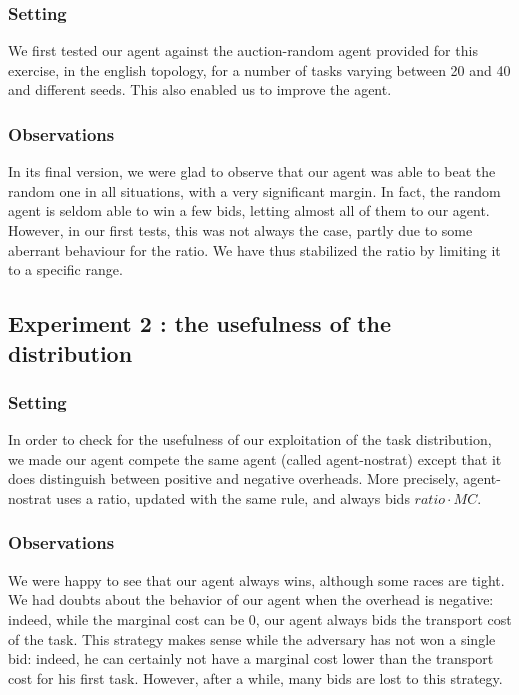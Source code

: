 \documentclass[11pt]{article}
\begin{document}
\subsubsection{Setting}
We first tested our agent against the auction-random agent provided for this exercise, in the english topology, for a number of tasks varying between 20 and 40 and different seeds. This also enabled us to improve the agent.

\subsubsection{Observations}
In its final version, we were glad to observe that our agent was able to beat the random one in all situations, with a very significant margin. In fact, the random agent is seldom able to win a few bids, letting almost all of them to our agent. However, in our first tests, this was not always the case, partly due to some aberrant behaviour for the ratio. We have thus stabilized the ratio by limiting it to a specific range. 

\subsection{Experiment 2 : the usefulness of the distribution}

\subsubsection{Setting}
In order to check for the usefulness of our exploitation of the task distribution, we made our agent compete the same agent (called agent-nostrat) except that it does distinguish between positive and negative overheads. More precisely, agent-nostrat uses a ratio, updated with the same rule, and always bids $ratio \cdot MC$. 

\subsubsection{Observations}
We were happy to see that our agent always wins, although some races are tight. We had doubts about the behavior of our agent when the overhead is negative: indeed, while the marginal cost can be 0, our agent always bids the transport cost of the task. This strategy makes sense while the adversary has not won a single bid: indeed, he can certainly not have a marginal cost lower than the transport cost for his first task. However, after a while, many bids are lost to this strategy.
\end{document}
